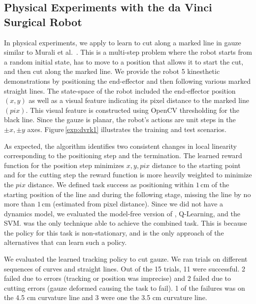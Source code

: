 \subsection{Physical Experiments with the da Vinci Surgical Robot}
In physical experiments, we apply \hirl to learn to cut along a marked line in gauze similar to Murali et al.~\cite{murali2015learning}.
This is a multi-step problem where the robot starts from a random initial state, has to move to a position that allows it to start the cut, and then cut along the marked line.
We provide the robot 5 kinesthetic demonstrations by positioning the end-effector and then following various marked straight lines.
The state-space of the robot included the end-effector position $(x,y)$ as well as a visual feature indicating its pixel distance to the marked line $(pix)$.
This visual feature is constructed using OpenCV thresholding for the black line.
Since the gauze is planar, the robot's actions are unit steps in the $\pm x, \pm y$ axes.
Figure\,\ref{exp:dvrk1} illustrates the training and test scenarios.

As expected, the algorithm identifies two consistent changes in local linearity corresponding to the positioning step and the termination.
The learned reward function for the position step minimizes $x,y,pix$ distance to the starting point and for the cutting step the reward function is more heavily weighted to minimize the $pix$ distance.
We defined task success as positioning within $1$\,cm of the starting position of the line and during the following stage, missing the line by no more than $1$\,cm (estimated from pixel distance).
Since we did not have a dynamics model, we evaluated the model-free version of \hirl, Q-Learning, and the SVM.
\hirl was the only technique able to achieve the combined task.
This is because the policy for this task is non-stationary, and \hirl is the only approach of the alternatives that can learn such a policy.

We evaluated the learned tracking policy to cut gauze.
We ran trials on different sequences of curves and straight lines. 
Out of the 15 trials, 11 were successful.
2 failed due to \hirl errors (tracking or position was imprecise) and 2 failed due to cutting errors (gauze deformed causing the task to fail).
1 of the failures was on the 4.5 cm curvature line and 3 were one the 3.5 cm curvature line.




